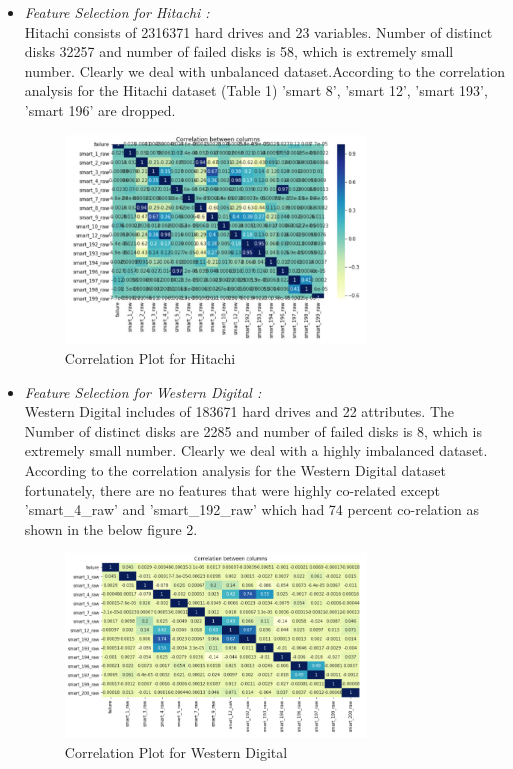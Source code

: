 \documentclass[conference]{IEEEtran}
\begin{document}
\begin{itemize}

    \item \textit{Feature Selection for Hitachi :}\\
    Hitachi consists of 2316371 hard drives and 23 variables. Number of distinct disks 32257 and number of failed disks is 58, which is extremely small number. Clearly we deal with unbalanced dataset.According to the correlation analysis for the Hitachi dataset (Table 1) 'smart 8', 'smart 12', 'smart 193', 'smart 196' are dropped.\\
    
    
    \begin{figure}[htbp]
        \centerline{\includegraphics[width = 8cm]{Upeksha/Capture3.JPG}}
        \caption{Correlation Plot for Hitachi}
        \label{fig}
    \end{figure}

    \item \textit{Feature Selection for Western Digital :}\\
    Western Digital includes of 183671 hard drives and 22 attributes. The Number of distinct disks are 2285 and number of failed disks is 8, which is extremely small number. Clearly we deal with a highly imbalanced dataset. According to the correlation analysis for the Western Digital dataset fortunately, there are no features that were highly co-related except 'smart\_4\_raw' and 'smart\_192\_raw' which had 74 percent co-relation as shown in the below figure 2.\\
    
    
    \begin{figure}[htbp]
        \centerline{\includegraphics[width = 8cm]{Sampath/corelation_WD.PNG}}
        \caption{Correlation Plot for Western Digital}
        \label{fig}
    \end{figure}
    

\end{itemize}
\end{document}
